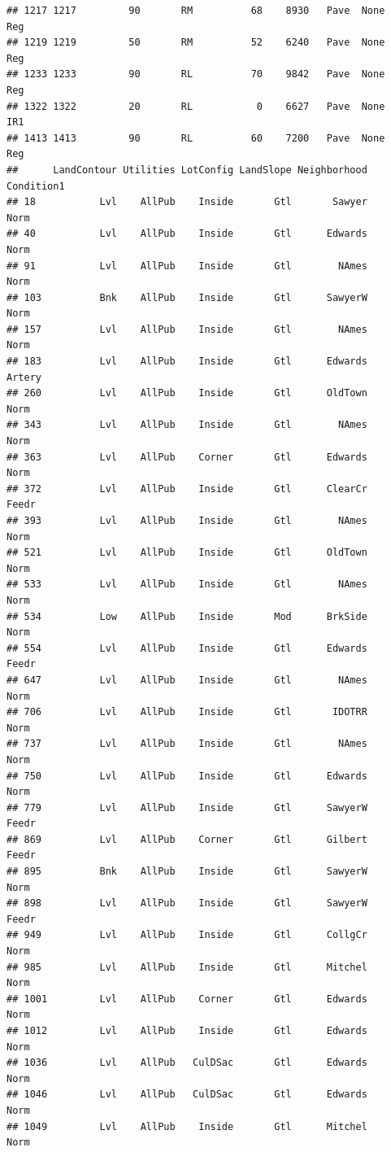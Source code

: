 \documentclass[]{article}
\begin{document}
\begin{verbatim}
## 1217 1217         90       RM          68    8930   Pave  None      Reg
## 1219 1219         50       RM          52    6240   Pave  None      Reg
## 1233 1233         90       RL          70    9842   Pave  None      Reg
## 1322 1322         20       RL           0    6627   Pave  None      IR1
## 1413 1413         90       RL          60    7200   Pave  None      Reg
##      LandContour Utilities LotConfig LandSlope Neighborhood Condition1
## 18           Lvl    AllPub    Inside       Gtl       Sawyer       Norm
## 40           Lvl    AllPub    Inside       Gtl      Edwards       Norm
## 91           Lvl    AllPub    Inside       Gtl        NAmes       Norm
## 103          Bnk    AllPub    Inside       Gtl      SawyerW       Norm
## 157          Lvl    AllPub    Inside       Gtl        NAmes       Norm
## 183          Lvl    AllPub    Inside       Gtl      Edwards     Artery
## 260          Lvl    AllPub    Inside       Gtl      OldTown       Norm
## 343          Lvl    AllPub    Inside       Gtl        NAmes       Norm
## 363          Lvl    AllPub    Corner       Gtl      Edwards       Norm
## 372          Lvl    AllPub    Inside       Gtl      ClearCr      Feedr
## 393          Lvl    AllPub    Inside       Gtl        NAmes       Norm
## 521          Lvl    AllPub    Inside       Gtl      OldTown       Norm
## 533          Lvl    AllPub    Inside       Gtl        NAmes       Norm
## 534          Low    AllPub    Inside       Mod      BrkSide       Norm
## 554          Lvl    AllPub    Inside       Gtl      Edwards      Feedr
## 647          Lvl    AllPub    Inside       Gtl        NAmes       Norm
## 706          Lvl    AllPub    Inside       Gtl       IDOTRR       Norm
## 737          Lvl    AllPub    Inside       Gtl        NAmes       Norm
## 750          Lvl    AllPub    Inside       Gtl      Edwards       Norm
## 779          Lvl    AllPub    Inside       Gtl      SawyerW      Feedr
## 869          Lvl    AllPub    Corner       Gtl      Gilbert      Feedr
## 895          Bnk    AllPub    Inside       Gtl      SawyerW       Norm
## 898          Lvl    AllPub    Inside       Gtl      SawyerW      Feedr
## 949          Lvl    AllPub    Inside       Gtl      CollgCr       Norm
## 985          Lvl    AllPub    Inside       Gtl      Mitchel       Norm
## 1001         Lvl    AllPub    Corner       Gtl      Edwards       Norm
## 1012         Lvl    AllPub    Inside       Gtl      Edwards       Norm
## 1036         Lvl    AllPub   CulDSac       Gtl      Edwards       Norm
## 1046         Lvl    AllPub   CulDSac       Gtl      Edwards       Norm
## 1049         Lvl    AllPub    Inside       Gtl      Mitchel       Norm

\end{verbatim}
\end{document}
